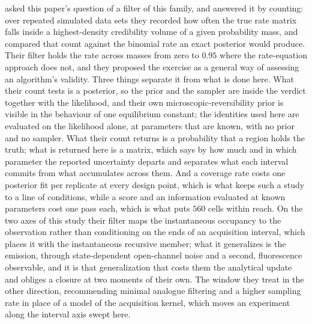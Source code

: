 \citet{munch2022bayesian} asked this paper's question of a filter of this family, and answered it by counting: over repeated simulated data sets they recorded how often the true rate matrix falls inside a highest-density credibility volume of a given probability mass, and compared that count against the binomial rate an exact posterior would produce. Their filter holds the rate across masses from zero to $0.95$ where the rate-equation approach does not, and they proposed the exercise as a general way of assessing an algorithm's validity. Three things separate it from what is done here. What their count tests is a posterior, so the prior and the sampler are inside the verdict together with the likelihood, and their own microscopic-reversibility prior is visible in the behaviour of one equilibrium constant; the identities used here are evaluated on the likelihood alone, at parameters that are known, with no prior and no sampler. What their count returns is a probability that a region holds the truth; what is returned here is a matrix, which says by how much and in which parameter the reported uncertainty departs and separates what each interval commits from what accumulates across them. And a coverage rate costs one posterior fit per replicate at every design point, which is what keeps such a study to a line of conditions, while a score and an information evaluated at known parameters cost one pass each, which is what puts $560$ cells within reach.
On the two axes of this study their filter maps the instantaneous occupancy to the observation rather than conditioning on the ends of an acquisition interval, which places it with the instantaneous recursive member; what it generalizes is the emission, through state-dependent open-channel noise and a second, fluorescence observable, and it is that generalization that costs them the analytical update and obliges a closure at two moments of their own. The window they treat in the other direction, recommending minimal analogue filtering and a higher sampling rate in place of a model of the acquisition kernel, which moves an experiment along the interval axis swept here.
